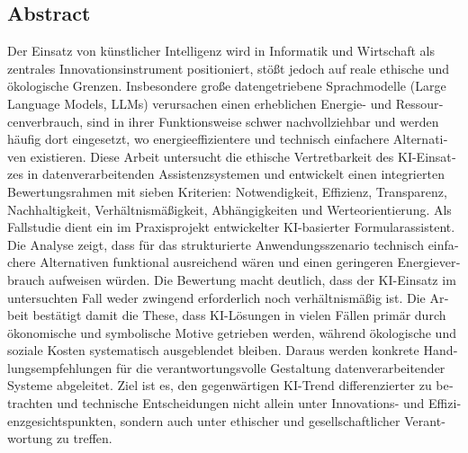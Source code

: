 \begin{otherlanguage}{ngerman}
	\chapter*{Abstract}
		Der Einsatz von künstlicher Intelligenz wird in Informatik und Wirtschaft als zentrales Innovationsinstrument positioniert, stößt jedoch auf reale ethische und ökologische Grenzen. Insbesondere große datengetriebene Sprachmodelle (Large Language Models, LLMs) verursachen einen erheblichen Energie- und Ressourcenverbrauch, sind in ihrer Funktionsweise schwer nachvollziehbar und werden häufig dort eingesetzt, wo energieeffizientere und technisch einfachere Alternativen existieren. Diese Arbeit untersucht die ethische Vertretbarkeit des KI-Einsatzes in datenverarbeitenden Assistenzsystemen und entwickelt einen integrierten Bewertungsrahmen mit sieben Kriterien: Notwendigkeit, Effizienz, Transparenz, Nachhaltigkeit, Verhältnismäßigkeit, Abhängigkeiten und Werteorientierung. Als Fallstudie dient ein im Praxisprojekt entwickelter KI-basierter Formularassistent. Die Analyse zeigt, dass für das strukturierte Anwendungsszenario technisch einfachere Alternativen funktional ausreichend wären und einen geringeren Energieverbrauch aufweisen würden. Die Bewertung macht deutlich, dass der KI-Einsatz im untersuchten Fall weder zwingend erforderlich noch verhältnismäßig ist. Die Arbeit bestätigt damit die These, dass KI-Lösungen in vielen Fällen primär durch ökonomische und symbolische Motive getrieben werden, während ökologische und soziale Kosten systematisch ausgeblendet bleiben. Daraus werden konkrete Handlungsempfehlungen für die verantwortungsvolle Gestaltung datenverarbeitender Systeme abgeleitet. Ziel ist es, den gegenwärtigen KI-Trend differenzierter zu betrachten und technische Entscheidungen nicht allein unter Innovations- und Effizienzgesichtspunkten, sondern auch unter ethischer und gesellschaftlicher Verantwortung zu treffen.
\end{otherlanguage}
